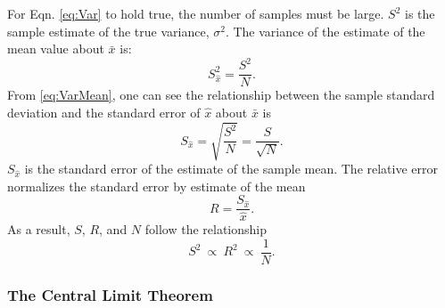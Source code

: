 For Eqn. \eqref{eq:Var} to hold true, the number of samples must be large.
$S^2$ is the sample estimate of the true variance, $\sigma^2$. %
The variance of the estimate of the mean value about $\bar{x}$ is:
\begin{equation}
S^{ 2 }_{ \hat { x }  }=\frac{S^2}{N}.
\label{eq:VarMean}
\end{equation}
From \eqref{eq:VarMean}, one can see the relationship between the sample standard
deviation and the standard error of $\hat{x}$ about $\bar{x}$ is
\begin{equation}
S_{ \hat { x }  }=\sqrt { \frac { S^{ 2 } }{ N }  } =\frac { S }{ \sqrt { N }}.
\label{eq:VarN}
\end{equation}
$S_{\hat{x}}$ is the standard error of the estimate of the sample mean.
The relative error normalizes the standard error by estimate of the mean
\begin{equation}
R = \frac{S_{ \hat { x }  }}{\hat{x}} .
\label{eq:RelativeErr}
\end{equation}
As a result, $S$, $R$, and $N$ follow the relationship
\begin{equation}
S^2\:\propto\: R^2\:\propto\:\frac{1}{N} .
\label{eq:S to R}
\end{equation}

\subsubsection{The Central Limit Theorem}
\label{subsubsec:CLT}

